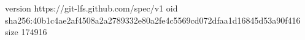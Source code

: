 version https://git-lfs.github.com/spec/v1
oid sha256:40b1c4ae2af4508a2a2789332e80a2fe4c5569cd072dfaa1d16845d53a90f416
size 174916
